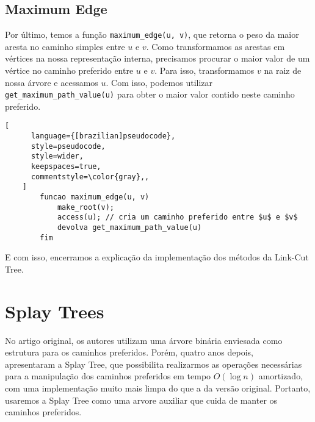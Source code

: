 \subsection{Maximum Edge}
\label{subsection:lct-max-edge}

Por último, temos a função \texttt{maximum\_edge(u, v)}, que retorna o peso da maior aresta no caminho simples entre $u$ e $v$. Como transformamos as arestas em vértices na nossa representação interna, precisamos procurar o maior valor de um vértice no caminho preferido entre $u$ e $v$. Para isso, transformamos $v$ na raiz de nossa árvore e acessamos $u$. Com isso, podemos utilizar \texttt{get\_maximum\_path\_value(u)} para obter o maior valor contido neste caminho preferido.

\begin{programruledcaption}{\label{lct:max-edge}}
    \begin{lstlisting}[
      language={[brazilian]pseudocode},
      style=pseudocode,
      style=wider,
      keepspaces=true,
      commentstyle=\color{gray},,
    ]
        funcao maximum_edge(u, v)
            make_root(v);
            access(u); // cria um caminho preferido entre $u$ e $v$
            devolva get_maximum_path_value(u)
        fim
    \end{lstlisting}
\end{programruledcaption}

E com isso, encerramos a explicação da implementação dos métodos da Link-Cut Tree.

\section{Splay Trees}
\label{sec:lct-splay-trees}

No artigo original, os autores utilizam uma árvore binária enviesada como estrutura para os caminhos preferidos. Porém, quatro anos depois, ~\citet{10.1145/3828.3835} apresentaram a Splay Tree, que possibilita realizarmos as operações necessárias para a manipulação dos caminhos preferidos em tempo $O(\log n)$ amortizado, com uma implementação muito mais limpa do que a da versão original. Portanto, usaremos a Splay Tree como uma arvore auxiliar que cuida de manter os caminhos preferidos.


